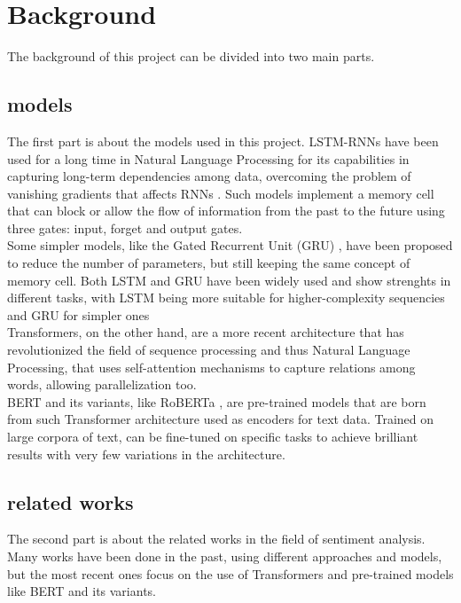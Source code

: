 \section{Background}
\label{sec:background}
    The background of this project can be divided into two main parts.

    \subsection{models}
    \label{sec:models}
        The first part is about the models used in this project. LSTM-RNNs have been used for
        a long time in Natural Language Processing for its capabilities in capturing long-term
        dependencies among data, overcoming the problem of vanishing gradients that affects RNNs
        \citep{hochreiter1997long}. Such models implement a memory cell that can block or allow
        the flow of information from the past to the future using three gates:
        input, forget and output gates.\\
        
        Some simpler models, like the Gated Recurrent Unit (GRU) \citep{cho2014learning},
        have been proposed to reduce the number of parameters, but still keeping the
        same concept of memory cell. Both LSTM and GRU have been widely used and
        show strenghts in different tasks, with LSTM being more suitable for
        higher-complexity sequencies and GRU for simpler ones \citep{Cahuantzi_2023} \\

        Transformers, on the other hand, are a more recent architecture \citep{vaswani2023attentionneed}
        that has revolutionized the field of sequence processing and thus Natural
        Language Processing, that uses self-attention mechanisms to capture 
        relations among words, allowing parallelization too. \\

        BERT \citep{devlin2019bert} and its variants, like RoBERTa \citep{liu2019robertarobustlyoptimizedbert},
        are pre-trained models that are born from such Transformer architecture used
        as encoders for text data. Trained on large corpora of text, can be 
        fine-tuned on specific tasks to achieve brilliant results with very few 
        variations in the architecture.

    \subsection{related works}
    \label{sec:related_works}
        The second part is about the related works in the field of sentiment analysis.
        Many works have been done in the past, using different approaches and models,
        but the most recent ones focus on the use of Transformers and pre-trained models
        like BERT and its variants.\\
        
